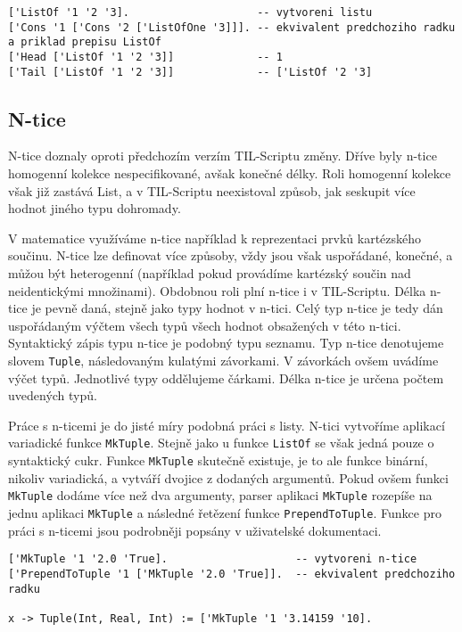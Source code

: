 \begin{lstlisting}[caption={Příklad využití seznamů}]
['ListOf '1 '2 '3].                    -- vytvoreni listu
['Cons '1 ['Cons '2 ['ListOfOne '3]]]. -- ekvivalent predchoziho radku a priklad prepisu ListOf
['Head ['ListOf '1 '2 '3]]             -- 1
['Tail ['ListOf '1 '2 '3]]             -- ['ListOf '2 '3]
\end{lstlisting}

\subsection{N-tice}

N-tice doznaly oproti předchozím verzím TIL-Scriptu změny. Dříve byly n-tice homogenní kolekce
nespecifikované, avšak konečné délky. Roli homogenní kolekce však již zastává List, a v TIL-Scriptu
neexistoval způsob, jak seskupit více hodnot jiného typu dohromady.

V matematice využíváme n-tice například k reprezentaci prvků kartézského součinu. N-tice lze
definovat více způsoby, vždy jsou však uspořádané, konečné, a můžou být heterogenní (například
pokud provádíme kartézský součin nad neidentickými množinami). Obdobnou roli plní n-tice i
v TIL-Scriptu. Délka n-tice je pevně daná, stejně jako typy hodnot v n-tici. Celý typ n-tice je
tedy dán uspořádaným výčtem všech typů všech hodnot obsažených v této n-tici. Syntaktický zápis
typu n-tice je podobný typu seznamu. Typ n-tice denotujeme slovem \lstinline{Tuple}, následovaným
kulatými závorkami. V závorkách ovšem uvádíme výčet typů. Jednotlivé typy oddělujeme čárkami. Délka
n-tice je určena počtem uvedených typů.

Práce s n-ticemi je do jisté míry podobná práci s listy. N-tici vytvoříme aplikací variadické
funkce \lstinline{MkTuple}. Stejně jako u funkce \lstinline{ListOf} se však jedná pouze o
syntaktický cukr. Funkce \lstinline{MkTuple} skutečně existuje, je to ale funkce binární, nikoliv
variadická, a vytváří dvojice z dodaných argumentů. Pokud ovšem funkci \lstinline{MkTuple} dodáme
více než dva argumenty, parser aplikaci \lstinline{MkTuple} rozepíše na jednu aplikaci
\lstinline{MkTuple} a následné řetězení funkce \lstinline{PrependToTuple}. Funkce pro práci
s n-ticemi jsou podrobněji popsány v uživatelské dokumentaci.
 
\begin{lstlisting}[caption={Příklad využití n-tic}]
['MkTuple '1 '2.0 'True].                    -- vytvoreni n-tice
['PrependToTuple '1 ['MkTuple '2.0 'True]].  -- ekvivalent predchoziho radku

x -> Tuple(Int, Real, Int) := ['MkTuple '1 '3.14159 '10].
\end{lstlisting}

